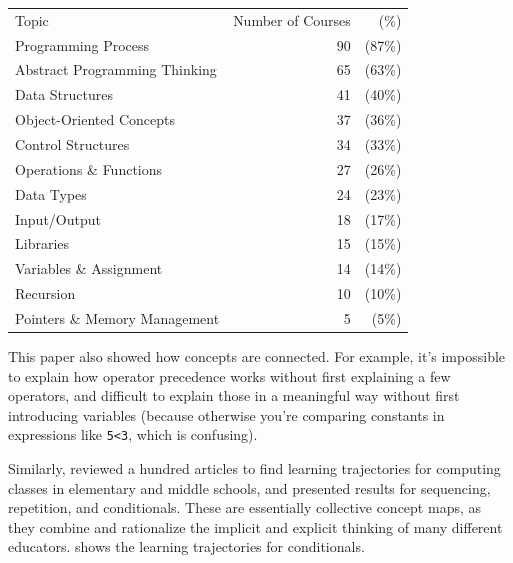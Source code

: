 {\small
\begin{longtable}{lrr}
  Topic & Number of Courses & (\%) \\
  Programming Process & 90 & (87\%) \\
  Abstract Programming Thinking & 65 & (63\%) \\
  Data Structures & 41 & (40\%) \\
  Object-Oriented Concepts & 37 & (36\%) \\
  Control Structures & 34 & (33\%) \\
  Operations \& Functions & 27 & (26\%) \\
  Data Types & 24 & (23\%) \\
  Input/Output & 18 & (17\%) \\
  Libraries & 15 & (15\%) \\
  Variables \& Assignment & 14 & (14\%) \\
  Recursion & 10 & (10\%) \\
  Pointers \& Memory Management & 5 & (5\%) \\
\end{longtable}
}

This paper also showed how concepts are connected.  For example, it's
impossible to explain how operator precedence works without first
explaining a few operators, and difficult to explain those in a
meaningful way without first introducing variables (because otherwise
you're comparing constants in expressions like \texttt{5{\textless}3},
which is confusing).

Similarly, \cite{Rich2017} reviewed a hundred articles to find
learning trajectories for computing classes in elementary and middle
schools, and presented results for sequencing, repetition, and
conditionals.  These are essentially collective concept maps, as they
combine and rationalize the implicit and explicit thinking of many
different educators.   shows the learning
trajectories for conditionals.

